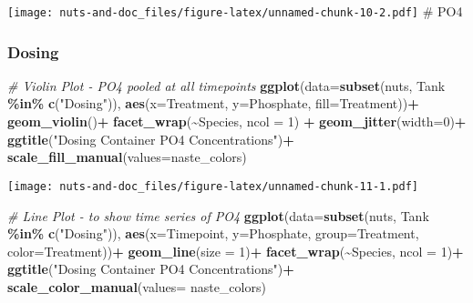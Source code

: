 \documentclass[
]{article}
\newenvironment{Shaded}{\begin{snugshade}}{\end{snugshade}}
\newcommand{\AttributeTok}[1]{\textcolor[rgb]{0.13,0.29,0.53}{#1}}
\newcommand{\CommentTok}[1]{\textcolor[rgb]{0.56,0.35,0.01}{\textit{#1}}}
\newcommand{\DecValTok}[1]{\textcolor[rgb]{0.00,0.00,0.81}{#1}}
\newcommand{\FunctionTok}[1]{\textcolor[rgb]{0.13,0.29,0.53}{\textbf{#1}}}
\newcommand{\NormalTok}[1]{#1}
\newcommand{\SpecialCharTok}[1]{\textcolor[rgb]{0.81,0.36,0.00}{\textbf{#1}}}
\newcommand{\StringTok}[1]{\textcolor[rgb]{0.31,0.60,0.02}{#1}}
\begin{document}
\texttt{[image: nuts-and-doc\_files/figure-latex/unnamed-chunk-10-2.pdf]}
\# PO4

\hypertarget{dosing-3}{%
\subsubsection{Dosing}\label{dosing-3}}

\begin{Shaded}
\begin{Highlighting}[]
\CommentTok{\# Violin Plot {-} PO4 pooled at all timepoints}
\FunctionTok{ggplot}\NormalTok{(}\AttributeTok{data=}\FunctionTok{subset}\NormalTok{(nuts, Tank }\SpecialCharTok{\%in\%} \FunctionTok{c}\NormalTok{(}\StringTok{"Dosing"}\NormalTok{)), }\FunctionTok{aes}\NormalTok{(}\AttributeTok{x=}\NormalTok{Treatment, }\AttributeTok{y=}\NormalTok{Phosphate, }\AttributeTok{fill=}\NormalTok{Treatment))}\SpecialCharTok{+}
  \FunctionTok{geom\_violin}\NormalTok{()}\SpecialCharTok{+}
  \FunctionTok{facet\_wrap}\NormalTok{(}\SpecialCharTok{\textasciitilde{}}\NormalTok{Species, }\AttributeTok{ncol =} \DecValTok{1}\NormalTok{) }\SpecialCharTok{+}
  \FunctionTok{geom\_jitter}\NormalTok{(}\AttributeTok{width=}\DecValTok{0}\NormalTok{)}\SpecialCharTok{+}
  \FunctionTok{ggtitle}\NormalTok{(}\StringTok{"Dosing Container PO4 Concentrations"}\NormalTok{)}\SpecialCharTok{+}
  \FunctionTok{scale\_fill\_manual}\NormalTok{(}\AttributeTok{values=}\NormalTok{naste\_colors)}
\end{Highlighting}
\end{Shaded}

\texttt{[image: nuts-and-doc\_files/figure-latex/unnamed-chunk-11-1.pdf]}

\begin{Shaded}
\begin{Highlighting}[]
\CommentTok{\# Line Plot {-} to show time series of PO4}
\FunctionTok{ggplot}\NormalTok{(}\AttributeTok{data=}\FunctionTok{subset}\NormalTok{(nuts, Tank }\SpecialCharTok{\%in\%} \FunctionTok{c}\NormalTok{(}\StringTok{"Dosing"}\NormalTok{)), }\FunctionTok{aes}\NormalTok{(}\AttributeTok{x=}\NormalTok{Timepoint, }\AttributeTok{y=}\NormalTok{Phosphate, }\AttributeTok{group=}\NormalTok{Treatment, }\AttributeTok{color=}\NormalTok{Treatment))}\SpecialCharTok{+}
  \FunctionTok{geom\_line}\NormalTok{(}\AttributeTok{size =} \DecValTok{1}\NormalTok{)}\SpecialCharTok{+}
  \FunctionTok{facet\_wrap}\NormalTok{(}\SpecialCharTok{\textasciitilde{}}\NormalTok{Species, }\AttributeTok{ncol =} \DecValTok{1}\NormalTok{)}\SpecialCharTok{+}
  \FunctionTok{ggtitle}\NormalTok{(}\StringTok{"Dosing Container PO4 Concentrations"}\NormalTok{)}\SpecialCharTok{+}
  \FunctionTok{scale\_color\_manual}\NormalTok{(}\AttributeTok{values=}\NormalTok{ naste\_colors)}
\end{Highlighting}
\end{Shaded}
\end{document}
